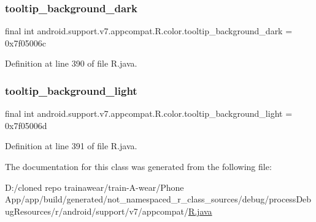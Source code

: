 \subsubsection{\texorpdfstring{tooltip\_background\_dark}{tooltip\_background\_dark}}
{\footnotesize\ttfamily final int android.\+support.\+v7.\+appcompat.\+R.\+color.\+tooltip\+\_\+background\+\_\+dark = 0x7f05006c\hspace{0.3cm}{\ttfamily [static]}}



Definition at line 390 of file R.\+java.

\mbox{\label{classandroid_1_1support_1_1v7_1_1appcompat_1_1_r_1_1color_aaebcd03ad73492f72e31f7ae1a5e949f}} 
\subsubsection{\texorpdfstring{tooltip\_background\_light}{tooltip\_background\_light}}
{\footnotesize\ttfamily final int android.\+support.\+v7.\+appcompat.\+R.\+color.\+tooltip\+\_\+background\+\_\+light = 0x7f05006d\hspace{0.3cm}{\ttfamily [static]}}



Definition at line 391 of file R.\+java.



The documentation for this class was generated from the following file\+:\begin{DoxyCompactItemize}
\item 
D\+:/cloned repo trainawear/train-\/\+A-\/wear/\+Phone App/app/build/generated/not\+\_\+namespaced\+\_\+r\+\_\+class\+\_\+sources/debug/process\+Debug\+Resources/r/android/support/v7/appcompat/\mbox{\hyperlink{process_debug_resources_2r_2android_2support_2v7_2appcompat_2_r_8java}{R.\+java}}\end{DoxyCompactItemize}
